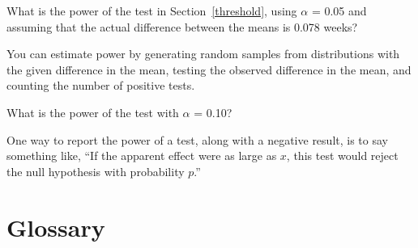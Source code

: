 \documentclass[12pt]{book}
\begin{document}

\begin{exercise}
What is the power of the test in Section~\ref{threshold}, using
$\alpha$ = 0.05 and assuming that the actual difference between the
means is 0.078 weeks?

You can estimate power by generating random samples from distributions
with the given difference in the mean, testing the observed difference
in the mean, and counting the number of positive tests.

What is the power of the test with $\alpha$ = 0.10?

\end{exercise}

One way to report the power of a test, along with a negative result,
is to say something like, ``If the apparent effect were as large
as $x$, this test would reject the null hypothesis with probability $p$.''













\section{Glossary}
\end{document}
